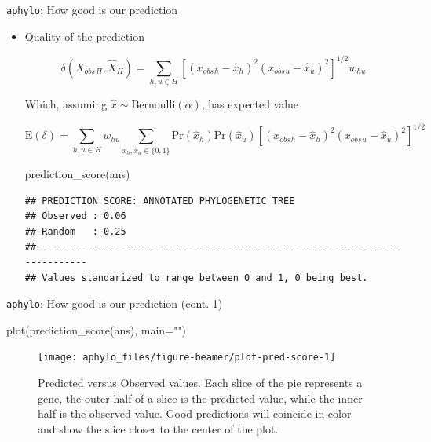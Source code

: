 \documentclass[9pt,ignorenonframetext,]{beamer}
\newenvironment{Shaded}{\begin{snugshade}}{\end{snugshade}}
\newcommand{\KeywordTok}[1]{\textcolor[rgb]{0.94,0.87,0.69}{#1}}
\newcommand{\DataTypeTok}[1]{\textcolor[rgb]{0.87,0.87,0.75}{#1}}
\newcommand{\StringTok}[1]{\textcolor[rgb]{0.80,0.58,0.58}{#1}}
\newcommand{\NormalTok}[1]{\textcolor[rgb]{0.80,0.80,0.80}{#1}}
\renewcommand{\Pr}[1]{{\mbox{Pr}\left(#1\right) }}
\newcommand{\Expected}[1]{{\mbox{E}\left(#1\right)}}
\newcommand{\AnnObs}{{X_{obs}}{}}%
\newcommand{\annObs}{{x_{obs}}{}}%
\newcommand{\AnnPred}{\hat X{}}
\newcommand{\annPred}{\hat x{}}
\begin{document}
\begin{frame}[fragile,t]{\texttt{aphylo}: How good is our prediction}

\begin{itemize}
\item
  Quality of the prediction\pause

  \[
  \label{eq:delta1}
  \delta\left(\AnnObs_H, \AnnPred_H\right) = 
  \sum_{h, u \in H}\left[(\annObs_{h} - \annPred_{h})^2(\annObs_{u} - \annPred_{u})^2\right]^{1/2}w_{hu}
  \]

  \pause

  Which, assuming \(\annPred\sim \mbox{Bernoulli}(\alpha)\), has
  expected value

  \[
  \Expected{\delta} = 
  \sum_{h, u \in H}w_{hu}\sum_{\annPred_h, \annPred_u \in \{0,1\}}\Pr{\annPred_h}\Pr{\annPred_u}\left[
  (\annObs_{h} - \annPred_{h})^2(\annObs_{u} - \annPred_{u})^2\right]^{1/2}
  \]

  \footnotesize

\begin{Shaded}
\begin{Highlighting}[]
\KeywordTok{prediction_score}\NormalTok{(ans)}
\end{Highlighting}
\end{Shaded}

\begin{verbatim}
## PREDICTION SCORE: ANNOTATED PHYLOGENETIC TREE
## Observed : 0.06 
## Random   : 0.25 
## ---------------------------------------------------------------------------
## Values standarized to range between 0 and 1, 0 being best.
\end{verbatim}

  \normalsize
\end{itemize}

\end{frame}

\begin{frame}[fragile,t]{\texttt{aphylo}: How good is our prediction
(cont. 1)}

\footnotesize

\begin{Shaded}
\begin{Highlighting}[]
\KeywordTok{plot}\NormalTok{(}\KeywordTok{prediction_score}\NormalTok{(ans), }\DataTypeTok{main=}\StringTok{""}\NormalTok{)}
\end{Highlighting}
\end{Shaded}

\begin{figure}

{\centering \texttt{[image: aphylo\_files/figure-beamer/plot-pred-score-1]} 

}

\caption{Predicted versus Observed values. Each slice of the pie represents a gene, the outer half of a slice is the predicted value, while the inner half is the observed value. Good predictions will coincide in color and show the slice closer to the center of the plot.}\label{fig:plot-pred-score}
\end{figure}

\normalsize

\end{frame}
\end{document}
